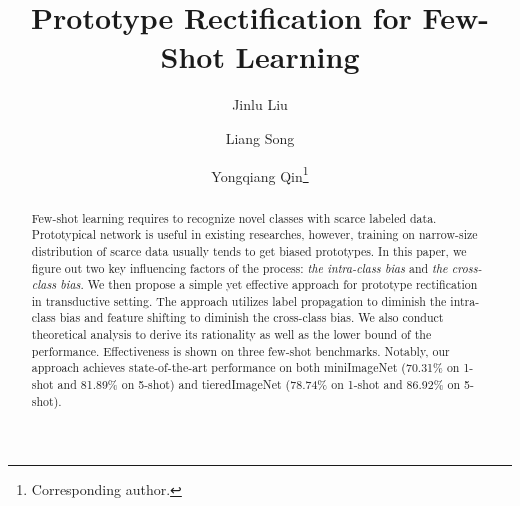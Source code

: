 \documentclass[runningheads]{llncs}
\begin{document}
\pagestyle{headings}
\mainmatter
\def\ECCVSubNumber{2748}  

\title{Prototype Rectification for Few-Shot Learning} 

\begin{comment}
\titlerunning{ECCV-20 submission ID \ECCVSubNumber} 
\authorrunning{ECCV-20 submission ID \ECCVSubNumber} 
\author{Anonymous ECCV submission}
\institute{Paper ID \ECCVSubNumber}
\end{comment}



\author{Jinlu Liu \and
Liang Song \and
Yongqiang Qin\thanks{Corresponding author.}}
\maketitle


\begin{abstract}
Few-shot learning requires to recognize novel classes with scarce labeled data. Prototypical network is useful in existing researches, however, training on narrow-size distribution of scarce data usually tends to get biased prototypes. In this paper, we figure out two key influencing factors of the process: \textit{the intra-class bias} and \textit{the cross-class bias}. We then propose a simple yet effective approach for prototype rectification in transductive setting. The approach utilizes label propagation to diminish the intra-class bias and feature shifting to diminish the cross-class bias. We also conduct theoretical analysis to derive its rationality as well as the lower bound of the performance. Effectiveness is shown on three few-shot benchmarks. Notably, our approach achieves state-of-the-art performance on both miniImageNet (70.31\% on 1-shot and 81.89\% on 5-shot) and tieredImageNet (78.74\% on 1-shot and 86.92\% on 5-shot).
\end{abstract}
\end{document}
